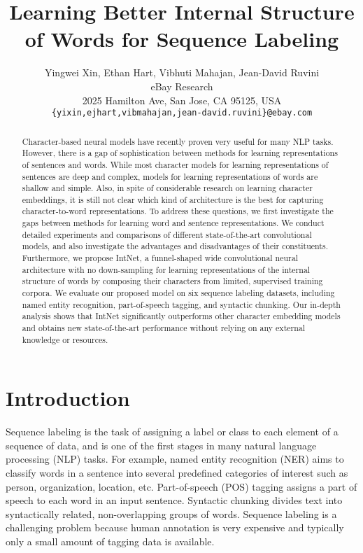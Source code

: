 \documentclass[11pt,a4paper]{article}
\title{Learning Better Internal Structure of Words for Sequence Labeling}
\author{Yingwei Xin, Ethan Hart, Vibhuti Mahajan, Jean-David Ruvini \\
  eBay Research \\ 2025 Hamilton Ave, San Jose, CA 95125, USA \\
  {\tt \{yixin,ejhart,vibmahajan,jean-david.ruvini\}@ebay.com}}
\date{}
\begin{document}
\maketitle
\begin{abstract}
 Character-based neural models have recently proven very useful for many NLP tasks. However, there is a gap of sophistication between methods for learning representations of sentences and words. While most character models for learning representations of sentences are deep and complex, models for learning representations of words are shallow and simple. Also, in spite of considerable research on learning character embeddings, it is still not clear which kind of architecture is the best for capturing character-to-word representations. To address these questions, we first investigate the gaps between methods for learning word and sentence representations. We conduct detailed experiments and comparisons of different state-of-the-art convolutional models, and also investigate the advantages and disadvantages of their constituents. Furthermore, we propose IntNet, a funnel-shaped wide convolutional neural architecture with no down-sampling for learning representations of the internal structure of words by composing their characters from limited, supervised training corpora. We evaluate our proposed model on six sequence labeling datasets, including named entity recognition, part-of-speech tagging, and syntactic chunking. Our in-depth analysis shows that IntNet significantly outperforms other character embedding models and obtains new state-of-the-art performance without relying on any external knowledge or resources.
\end{abstract}


\section{Introduction}
\label{sec:intro}

Sequence labeling is the task of assigning a label or class to each element of a sequence of data, and is one of the first stages in many natural language processing (NLP) tasks. For example, named entity recognition (NER) aims to classify words in a sentence into several predefined categories of interest such as person, organization, location, etc. Part-of-speech (POS) tagging assigns a part of speech to each word in an input sentence. Syntactic chunking divides text into syntactically related, non-overlapping groups of words. Sequence labeling is a challenging problem because human annotation is very expensive and typically only a small amount of tagging data is available. 
\end{document}
